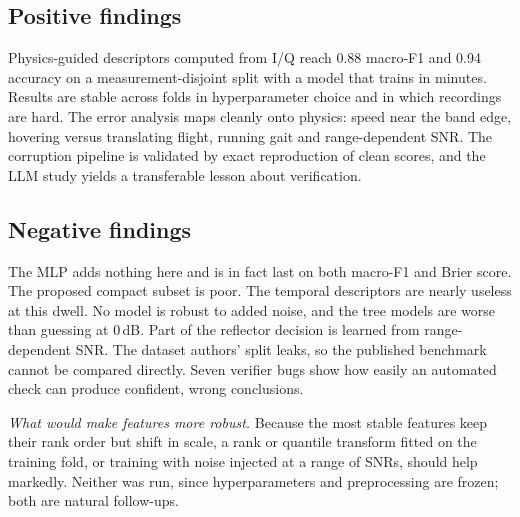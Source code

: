 \documentclass[conference]{IEEEtran}
\begin{document}
\subsection{Positive findings}
Physics-guided descriptors computed from I/Q reach 0.88 macro-F1 and 0.94 accuracy on a measurement-disjoint split with a model that trains in minutes. Results are stable across folds in hyperparameter choice and in which recordings are hard. The error analysis maps cleanly onto physics: speed near the band edge, hovering versus translating flight, running gait and range-dependent SNR. The corruption pipeline is validated by exact reproduction of clean scores, and the LLM study yields a transferable lesson about verification.

\subsection{Negative findings}
The MLP adds nothing here and is in fact last on both macro-F1 and Brier score. The proposed compact subset is poor. The temporal descriptors are nearly useless at this dwell. No model is robust to added noise, and the tree models are worse than guessing at 0\,dB. Part of the reflector decision is learned from range-dependent SNR. The dataset authors' split leaks, so the published benchmark cannot be compared directly. Seven verifier bugs show how easily an automated check can produce confident, wrong conclusions.

\emph{What would make features more robust.} Because the most stable features keep their rank order but shift in scale, a rank or quantile transform fitted on the training fold, or training with noise injected at a range of SNRs, should help markedly. Neither was run, since hyperparameters and preprocessing are frozen; both are natural follow-ups.
\end{document}
